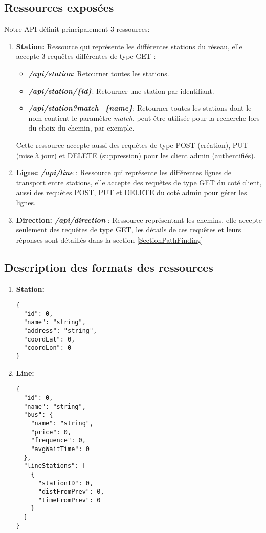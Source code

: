 \subsection{Ressources exposées}
Notre API définit principalement 3 ressources:
\begin{enumerate}
	\item \textbf{Station:} Ressource qui représente les différentes stations du réseau, elle accepte 3 requêtes différentes de type GET  : 
	      \begin{itemize}
	      	\item \emph{\textbf{/api/station}}: Retourner toutes les stations.
	      	\item \emph{\textbf{/api/station/\{id\}}}: Retourner une station par identifiant.
	      	\item \emph{\textbf{/api/station?match=\{name\}}}: Retourner toutes les stations dont le nom contient le paramètre \emph{match}, peut être utilisée pour la recherche lors du choix du chemin, par exemple.
	      \end{itemize}
	      			
	      Cette ressource accepte aussi des requêtes de type POST (création), PUT (mise à jour) et DELETE (suppression)  pour les client admin (authentifiés).
	\item \textbf{Ligne:} \emph{\textbf{/api/line}} : Ressource qui représente les différentes lignes de transport entre stations, elle accepte des requêtes de type GET du coté client, aussi des requêtes POST, PUT et DELETE du coté admin pour gérer les lignes.
	\item \textbf{Direction:}  \emph{\textbf{/api/direction}} : Ressource représentant les chemins, elle accepte seulement des requêtes de type GET, les détails de ces requêtes et leurs réponses sont détaillés dans la section \ref{SectionPathFinding}
\end{enumerate}
\subsection{Description des formats des ressources}
\lstset{style=JSON}

\begin{enumerate}
	\item \textbf{Station:}
	      \begin{lstlisting}[caption=Format JSON de Station]
{
  "id": 0,
  "name": "string",
  "address": "string",
  "coordLat": 0,
  "coordLon": 0
}		
\end{lstlisting}
	\item \textbf{Line:}	     
\begin{lstlisting}[caption=Format JSON de Line]
{
  "id": 0,
  "name": "string",
  "bus": {
    "name": "string",
    "price": 0,
    "frequence": 0,
    "avgWaitTime": 0
  },
  "lineStations": [
    {
      "stationID": 0,
      "distFromPrev": 0,
      "timeFromPrev": 0
    }
  ]
}
\end{lstlisting}
\end{enumerate}

